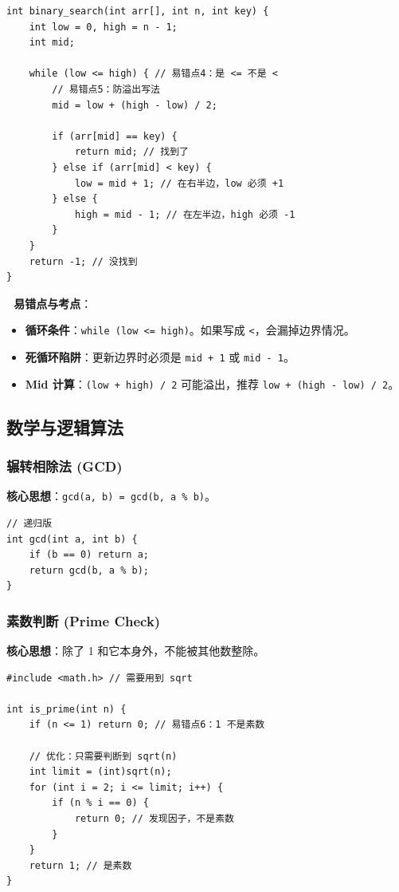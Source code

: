 \documentclass[a4paper,12pt]{article}
\begin{document}
\begin{lstlisting}
int binary_search(int arr[], int n, int key) {
    int low = 0, high = n - 1;
    int mid;
    
    while (low <= high) { // 易错点4：是 <= 不是 <
        // 易错点5：防溢出写法
        mid = low + (high - low) / 2; 
        
        if (arr[mid] == key) {
            return mid; // 找到了
        } else if (arr[mid] < key) {
            low = mid + 1; // 在右半边，low 必须 +1
        } else {
            high = mid - 1; // 在左半边，high 必须 -1
        }
    }
    return -1; // 没找到
}
\end{lstlisting}

\textbf{🔴 易错点与考点}：
\begin{itemize}
    \item \textbf{循环条件}：\texttt{while (low <= high)}。如果写成 \texttt{<}，会漏掉边界情况。
    \item \textbf{死循环陷阱}：更新边界时必须是 \texttt{mid + 1} 或 \texttt{mid - 1}。
    \item \textbf{Mid 计算}：\texttt{(low + high) / 2} 可能溢出，推荐 \texttt{low + (high - low) / 2}。
\end{itemize}

\subsection{数学与逻辑算法}

\subsubsection{辗转相除法 (GCD)}
\textbf{核心思想}：\texttt{gcd(a, b) = gcd(b, a \% b)}。

\begin{lstlisting}
// 递归版
int gcd(int a, int b) {
    if (b == 0) return a;
    return gcd(b, a % b);
}
\end{lstlisting}

\subsubsection{素数判断 (Prime Check)}
\textbf{核心思想}：除了 1 和它本身外，不能被其他数整除。

\begin{lstlisting}
#include <math.h> // 需要用到 sqrt

int is_prime(int n) {
    if (n <= 1) return 0; // 易错点6：1 不是素数
    
    // 优化：只需要判断到 sqrt(n)
    int limit = (int)sqrt(n);
    for (int i = 2; i <= limit; i++) {
        if (n % i == 0) {
            return 0; // 发现因子，不是素数
        }
    }
    return 1; // 是素数
}
\end{lstlisting}
\end{document}
